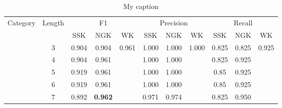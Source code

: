 \begin{table}[]
\centering
\caption{My caption}
\label{my-label}
\begin{tabular}{|c|c|c|c|c|c|c|c|c|c|c|}
\hline
Category               & Length                & \multicolumn{3}{c|}{F1}                                                                                         & \multicolumn{3}{c|}{Precision} & \multicolumn{3}{c|}{Recall}                                                                   \\ \cline{3-11} 
\multicolumn{1}{|l|}{} & \multicolumn{1}{l|}{} & SSK                                    & NGK                                    & WK                            & SSK      & NGK      & WK       & SSK                           & NGK                           & WK                            \\ \hline
                       & 3                     & \cellcolor[HTML]{EFEFEF}0.904          & \cellcolor[HTML]{EFEFEF}0.904          & \cellcolor[HTML]{EFEFEF}0.961 & 1.000    & 1.000    & 1.000    & \cellcolor[HTML]{EFEFEF}0.825 & \cellcolor[HTML]{EFEFEF}0.825 & \cellcolor[HTML]{EFEFEF}0.925 \\ \cline{2-11} 
                       & 4                     & \cellcolor[HTML]{EFEFEF}0.904          & \cellcolor[HTML]{EFEFEF}0.961          & \cellcolor[HTML]{EFEFEF}      & 1.000    & 1.000    &          & \cellcolor[HTML]{EFEFEF}0.825 & \cellcolor[HTML]{EFEFEF}0.925 & \cellcolor[HTML]{EFEFEF}      \\ \cline{2-11} 
                       & 5                     & \cellcolor[HTML]{EFEFEF}0.919          & \cellcolor[HTML]{EFEFEF}0.961          & \cellcolor[HTML]{EFEFEF}      & 1.000    & 1.000    &          & \cellcolor[HTML]{EFEFEF}0.85  & \cellcolor[HTML]{EFEFEF}0.925 & \cellcolor[HTML]{EFEFEF}      \\ \cline{2-11} 
                       & 6                     & \cellcolor[HTML]{EFEFEF}0.919          & \cellcolor[HTML]{EFEFEF}0.961          & \cellcolor[HTML]{EFEFEF}      & 1.000    & 1.000    &          & \cellcolor[HTML]{EFEFEF}0.85  & \cellcolor[HTML]{EFEFEF}0.925 & \cellcolor[HTML]{EFEFEF}      \\ \cline{2-11} 
                       & 7                     & \cellcolor[HTML]{EFEFEF}0.892          & \cellcolor[HTML]{EFEFEF}\textbf{0.962} & \cellcolor[HTML]{EFEFEF}      & 0.971    & 0.974    &          & \cellcolor[HTML]{EFEFEF}0.825 & \cellcolor[HTML]{EFEFEF}0.950 & \cellcolor[HTML]{EFEFEF}      \\ \cline{2-11} 

\end{tabular}
\end{table}
